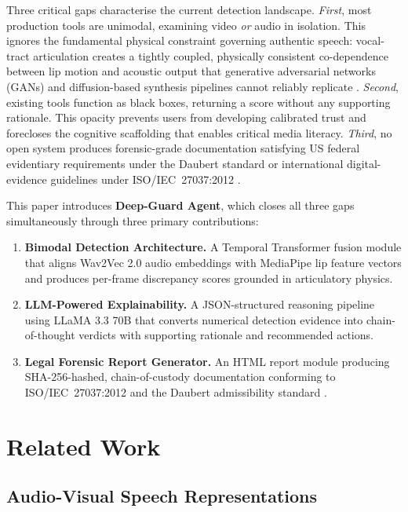 \documentclass[12pt]{article}
\begin{document}
Three critical gaps characterise the current detection landscape.
\textit{First}, most production tools are unimodal, examining video \textit{or}
audio in isolation.
This ignores the fundamental physical constraint governing authentic speech:
vocal-tract articulation creates a tightly coupled, physically consistent
co-dependence between lip motion and acoustic output that generative adversarial
networks (GANs) and diffusion-based synthesis pipelines cannot reliably replicate
\citep{wang2024artavdf}.
\textit{Second}, existing tools function as black boxes, returning a score
without any supporting rationale.
This opacity prevents users from developing calibrated trust and forecloses the
cognitive scaffolding that enables critical media literacy.
\textit{Third}, no open system produces forensic-grade documentation satisfying
US federal evidentiary requirements under the Daubert standard
\citep{daubert1993} or international digital-evidence guidelines under
ISO/IEC~27037:2012 \citep{iso27037}.

This paper introduces \textbf{Deep-Guard Agent}, which closes all three gaps
simultaneously through three primary contributions:
\begin{enumerate}[leftmargin=0.9in, noitemsep, topsep=2pt]
  \item \textbf{Bimodal Detection Architecture.}
    A Temporal Transformer fusion module that aligns Wav2Vec 2.0 audio embeddings
    \citep{baevski2020} with MediaPipe lip feature vectors and produces per-frame
    discrepancy scores grounded in articulatory physics.
  \item \textbf{LLM-Powered Explainability.}
    A JSON-structured reasoning pipeline using LLaMA 3.3 70B that converts
    numerical detection evidence into chain-of-thought verdicts with supporting
    rationale and recommended actions.
  \item \textbf{Legal Forensic Report Generator.}
    An HTML report module producing SHA-256-hashed, chain-of-custody
    documentation conforming to ISO/IEC~27037:2012 \citep{iso27037} and the
    Daubert admissibility standard \citep{daubert1993}.
\end{enumerate}

\section{Related Work}

\subsection{Audio-Visual Speech Representations}
\end{document}
